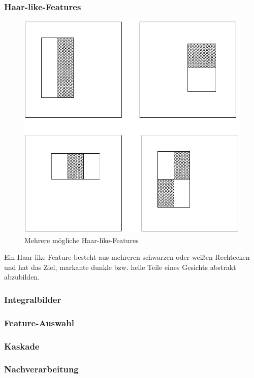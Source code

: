 \documentclass[doktyp=semarbeit, sprache=german]{TUBAFarbeiten}
\begin{document}
\subsubsection{Haar-like-Features}
\begin{figure}
	\centering
	\includegraphics[width=0.4\linewidth]{images/haarfeatures}
	\caption[Haar-like-Features]{Mehrere mögliche Haar-like-Features}
	\label{fig:haarfeatures}
\end{figure}


Ein Haar-like-Feature besteht aus mehreren schwarzen oder weißen Rechtecken und hat das Ziel, markante dunkle bzw. helle Teile eines Gesichts abstrakt abzubilden.

\subsubsection{Integralbilder}
\subsubsection{Feature-Auswahl}
\subsubsection{Kaskade}
\subsubsection{Nachverarbeitung}
\end{document}
